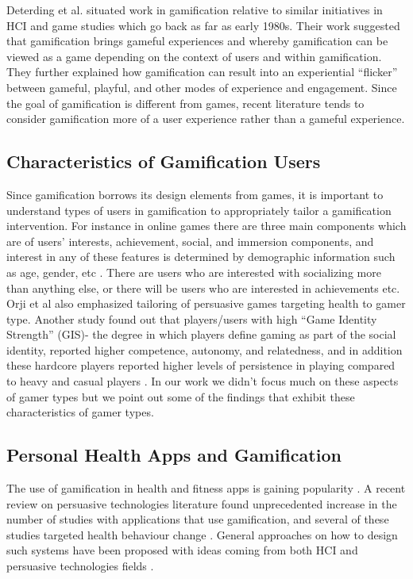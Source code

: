 \documentclass{sig-alternate}
\begin{document}
Deterding et al. \cite{deterding2011game} situated work in gamification relative to similar initiatives in HCI and game studies which go back as far as early 1980s. Their work suggested that gamification brings gameful experiences and whereby gamification can be viewed as a game depending on the context of users and within gamification. They further explained how gamification can result into an experiential ``flicker'' between gameful, playful, and other modes of experience and engagement. Since the goal of gamification is different from games, recent literature  tends to consider gamification more of a user experience rather than a gameful experience\cite{seaborn2015:gamification}.
\subsection{Characteristics of Gamification Users}
Since gamification borrows its design elements from games, it is important to understand types of users in gamification to appropriately tailor a gamification intervention. For instance in online games there are three main components which are of users' interests, achievement, social, and immersion components, and interest in any of these features is determined by demographic information such as age, gender, etc \cite{yee2006:motivations}. There are users who are interested with socializing more than anything else, or there will be users who are interested in achievements etc. Orji et al also \cite{orji2013:tailoring} emphasized tailoring of persuasive games targeting health to gamer type. Another study found out that players/users with high ``Game Identity Strength'' (GIS)- the degree in which players define gaming as part of the social identity, reported higher competence, autonomy, and relatedness, and in addition these hardcore players reported higher levels of persistence in playing compared to heavy and casual players \cite{neys2014:exploring}. In our work we didn't focus much on these aspects of gamer types but we point out some of the findings that exhibit these characteristics of gamer types. 
\subsection{Personal Health Apps and Gamification}  
The use of gamification in health and fitness apps is gaining popularity \cite{lister2014:just}. A recent review on persuasive technologies literature found unprecedented increase in the number of studies with applications that use gamification, and several of these studies targeted health behaviour change \cite{hamari2014persuasive}. General approaches on how to design such systems have been proposed with ideas coming from both HCI\cite{li2010:stage} and persuasive technologies fields \cite{fogg2009:behavior,Oinas-kukkonen:psd,Oinas-Kukkonen:foundation}.
\end{document}
